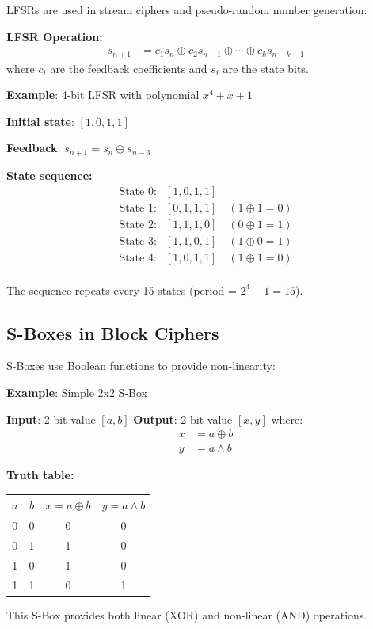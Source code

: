 \documentclass[11pt,a4paper]{article}
\begin{document}
LFSRs are used in stream ciphers and pseudo-random number generation:

\begin{theorybox}
\textbf{LFSR Operation:}
\begin{align*}
s_{n+1} &= c_1 s_n \oplus c_2 s_{n-1} \oplus \cdots \oplus c_k s_{n-k+1}
\end{align*}
where $c_i$ are the feedback coefficients and $s_i$ are the state bits.
\end{theorybox}

\begin{examplebox}
\textbf{Example}: 4-bit LFSR with polynomial $x^4 + x + 1$

\textbf{Initial state}: $[1, 0, 1, 1]$

\textbf{Feedback}: $s_{n+1} = s_n \oplus s_{n-3}$

\textbf{State sequence:}
\begin{align*}
\text{State 0}: & [1, 0, 1, 1] \\
\text{State 1}: & [0, 1, 1, 1] \quad (1 \oplus 1 = 0) \\
\text{State 2}: & [1, 1, 1, 0] \quad (0 \oplus 1 = 1) \\
\text{State 3}: & [1, 1, 0, 1] \quad (1 \oplus 0 = 1) \\
\text{State 4}: & [1, 0, 1, 1] \quad (1 \oplus 1 = 0) \\
\end{align*}

The sequence repeats every 15 states (period = $2^4 - 1 = 15$).
\end{examplebox}

\subsection{S-Boxes in Block Ciphers}

S-Boxes use Boolean functions to provide non-linearity:

\begin{examplebox}
\textbf{Example}: Simple 2x2 S-Box

\textbf{Input}: 2-bit value $[a, b]$
\textbf{Output}: 2-bit value $[x, y]$ where:
\begin{align*}
x &= a \oplus b \\
y &= a \wedge b
\end{align*}

\textbf{Truth table:}
\begin{center}
\begin{tabular}{|c|c|c|c|}
\hline
$a$ & $b$ & $x = a \oplus b$ & $y = a \wedge b$ \\
\hline
0 & 0 & 0 & 0 \\
0 & 1 & 1 & 0 \\
1 & 0 & 1 & 0 \\
1 & 1 & 0 & 1 \\
\hline
\end{tabular}
\end{center}

This S-Box provides both linear (XOR) and non-linear (AND) operations.
\end{examplebox}
\end{document}
